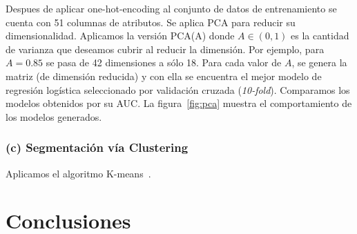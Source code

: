 \documentclass[letterpaper,11pt]{article}
\begin{document}
\begin{multicols}{2}
Despues de aplicar one-hot-encoding al conjunto de datos de entrenamiento se cuenta con 51 columnas de
atributos. Se aplica PCA para reducir su dimensionalidad. Aplicamos la versión PCA(A) donde $A\in (0,1)$ es la cantidad
de varianza que deseamos cubrir al reducir la dimensión. Por ejemplo, para $A=0.85$ se pasa de 42 dimensiones a sólo 18.
Para cada valor de $A$, se genera la matriz (de dimensión reducida) y con ella se encuentra el mejor modelo de regresión
logística seleccionado por validación cruzada (\emph{10-fold}). Comparamos los modelos obtenidos por su AUC. 
La figura~\ref{fig:pca} muestra el comportamiento de los modelos generados. 







\subsubsection*{(c) Segmentación vía Clustering} 
Aplicamos el algoritmo K-means~\cite[Cap. 13]{book2}.
\section{Conclusiones}


\end{multicols}
\end{document}
